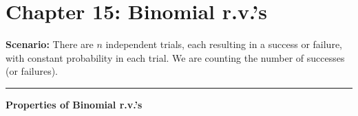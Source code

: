 \documentclass[12pt]{amsart}
\newtheorem{example}[theorem]{Example}
\begin{document}
\setcounter{section}{15}
{\huge  
\section*{Chapter 15: Binomial r.v.'s}
}

{\large 




\vspace{.5cm}

\textbf{Scenario:} There are $n$ independent trials, each resulting in a success or failure, with constant probability in each trial. We are counting the number of successes (or failures).

\vspace{.5cm}
\hrule
\vspace{.5cm}






\textbf{Properties of Binomial r.v.'s}

}  %
\end{document}
